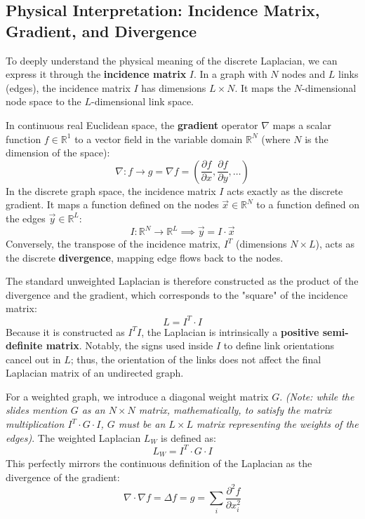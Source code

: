 \subsection{Physical Interpretation: Incidence Matrix, Gradient, and Divergence}
To deeply understand the physical meaning of the discrete Laplacian, we can express it through the \textbf{incidence matrix} \( I \). In a graph with \( N \) nodes and \( L \) links (edges), the incidence matrix \( I \) has dimensions \( L \times N \). It maps the \( N \)-dimensional node space to the \( L \)-dimensional link space.

In continuous real Euclidean space, the \textbf{gradient} operator \( \nabla \) maps a scalar function \( f \in \mathbb{R}^1 \) to a vector field in the variable domain \( \mathbb{R}^N \) (where \( N \) is the dimension of the space):
\[
    \nabla : f \rightarrow g = \nabla f = \left( \frac{\partial f}{\partial x}, \frac{\partial f}{\partial y}, \dots \right)
\]
In the discrete graph space, the incidence matrix \( I \) acts exactly as the discrete gradient. It maps a function defined on the nodes \( \vec{x} \in \mathbb{R}^N \) to a function defined on the edges \( \vec{y} \in \mathbb{R}^L \):
\[
    I : \mathbb{R}^N \rightarrow \mathbb{R}^L \implies \vec{y} = I \cdot \vec{x}
\]
Conversely, the transpose of the incidence matrix, \( I^T \) (dimensions \( N \times L \)), acts as the discrete \textbf{divergence}, mapping edge flows back to the nodes.

The standard unweighted Laplacian is therefore constructed as the product of the divergence and the gradient, which corresponds to the "square" of the incidence matrix:
\[
    L = I^T \cdot I
\]
Because it is constructed as \( I^T I \), the Laplacian is intrinsically a \textbf{positive semi-definite matrix}. Notably, the signs used inside \( I \) to define link orientations cancel out in \( L \); thus, the orientation of the links does not affect the final Laplacian matrix of an undirected graph.

For a weighted graph, we introduce a diagonal weight matrix \( G \). \textit{(Note: while the slides mention \( G \) as an \( N \times N \) matrix, mathematically, to satisfy the matrix multiplication \( I^T \cdot G \cdot I \), \( G \) must be an \( L \times L \) matrix representing the weights of the edges)}. The weighted Laplacian \( L_W \) is defined as:
\[
    L_W = I^T \cdot G \cdot I
\]
This perfectly mirrors the continuous definition of the Laplacian as the divergence of the gradient:
\[
    \nabla \cdot \nabla f = \Delta f = g = \sum_i \frac{\partial^2 f}{\partial x_i^2}
\]


